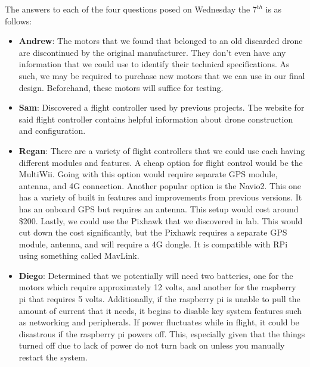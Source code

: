 \documentclass[12pt]{extarticle}
\newenvironment{myindentpar}[1]%
 {\begin{list}{}%
         {\setlength{\leftmargin}{#1}}%
         \item[]%
 }
 {\end{list}}
\begin{document}
\begin{myindentpar}{6.5mm}

    \noindent
    The answers to each of the four questions posed on Wednesday the $7^{th}$ is as follows:
    \begin{itemize}
        \setlength\itemsep{-0.1em}
    
        \item \textbf{Andrew}: The motors that we found that belonged to an old discarded drone are discontinued by the original manufacturer. They don't even have any information that we could use to identify their technical specifications. As such, we may be required to purchase new motors that we can use in our final design. Beforehand, these motors will suffice for testing.
        \item \textbf{Sam}: Discovered a flight controller used by previous projects. The website for said flight controller contains helpful information about drone construction and configuration.
        \item \textbf{Regan}: There are a variety of flight controllers that we could use each having different modules and features. A cheap option for flight control would be the MultiWii. Going with this option would require separate GPS module, antenna, and 4G connection. Another popular option is the Navio2. This one has a variety of built in features and improvements from previous versions. It has an onboard GPS but requires an antenna. This setup would cost around \$200. Lastly, we could use the Pixhawk that we discovered in lab. This would cut down the cost significantly, but the Pixhawk requires a separate GPS module, antenna, and will require a 4G dongle. It is compatible with RPi using something called MavLink.
        \item \textbf{Diego}: Determined that we potentially will need two batteries, one for the motors which require approximately 12 volts, and another for the raspberry pi that requires 5 volts. Additionally, if the raspberry pi is unable to pull the amount of current that it needs, it begins to disable key system features such as networking and peripherals. If power fluctuates while in flight, it could be disastrous if the raspberry pi powers off. This, especially given that the things turned off due to lack of power do not turn back on unless you manually restart the system.
        
    \end{itemize}

\end{myindentpar}
\end{document}

